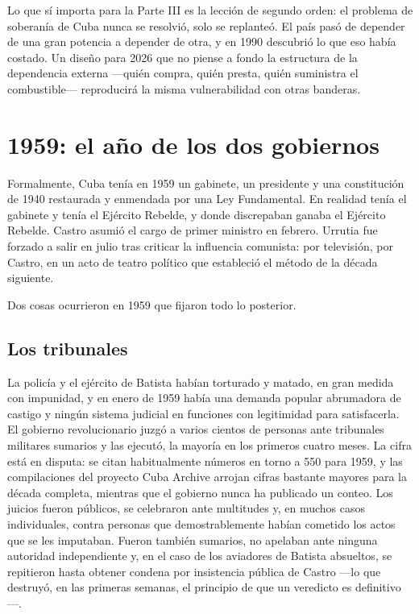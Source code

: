 Lo que sí importa para la Parte III es la lección de segundo orden: el problema
de soberanía de Cuba nunca se resolvió, solo se replanteó. El país pasó de
depender de una gran potencia a depender de otra, y en 1990 descubrió lo que eso
había costado. Un diseño para 2026 que no piense a fondo la estructura de la
dependencia externa ---quién compra, quién presta, quién suministra el
combustible--- reproducirá la misma vulnerabilidad con otras banderas.

\section{1959: el año de los dos gobiernos}

Formalmente, Cuba tenía en 1959 un gabinete, un presidente y una constitución de
1940 restaurada y enmendada por una Ley Fundamental. En realidad tenía el
gabinete y tenía el Ejército Rebelde, y donde discrepaban ganaba el Ejército
Rebelde. Castro asumió el cargo de primer ministro en febrero. Urrutia fue
forzado a salir en julio tras criticar la influencia comunista: por televisión,
por Castro, en un acto de teatro político que estableció el método de la década
siguiente.

Dos cosas ocurrieron en 1959 que fijaron todo lo posterior.

\subsection{Los tribunales}

La policía y el ejército de Batista habían torturado y matado, en gran medida con
impunidad, y en enero de 1959 había una demanda popular abrumadora de castigo y
ningún sistema judicial en funciones con legitimidad para satisfacerla. El
gobierno revolucionario juzgó a varios cientos de personas ante tribunales
militares sumarios y las ejecutó, la mayoría en los primeros cuatro meses. La
cifra está en disputa: se citan habitualmente números en torno a 550 para 1959, y
las compilaciones del proyecto Cuba Archive arrojan cifras bastante mayores para
la década completa, mientras que el gobierno nunca ha publicado un conteo.\unv{}
Los juicios fueron públicos, se celebraron ante multitudes y, en muchos casos
individuales, contra personas que demostrablemente habían cometido los actos que
se les imputaban. Fueron también sumarios, no apelaban ante ninguna autoridad
independiente y, en el caso de los aviadores de Batista absueltos, se repitieron
hasta obtener condena por insistencia pública de Castro ---lo que destruyó, en
las primeras semanas, el principio de que un veredicto es definitivo---.

